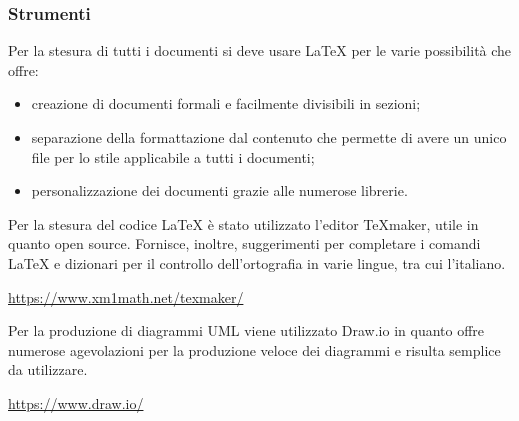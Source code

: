 \subsubsection{Strumenti}
\myparagraph{\LaTeX}
Per la stesura di tutti i documenti si deve usare \LaTeX{} per le varie possibilità che offre:
\begin{itemize}
\item creazione di documenti formali e facilmente divisibili in sezioni;
\item separazione della formattazione dal contenuto che permette di avere un unico file per lo stile applicabile a tutti i documenti;
\item personalizzazione dei documenti grazie alle numerose librerie.
\end{itemize}

Per la stesura del codice \LaTeX{} è stato utilizzato l'editor \TeX maker, utile in quanto open source. Fornisce, inoltre, suggerimenti per completare i comandi \LaTeX{} e dizionari per il controllo dell'ortografia in varie lingue, tra cui l'italiano.
\begin{center}
\url{https://www.xm1math.net/texmaker/}
\end{center}

Per la produzione di diagrammi UML viene utilizzato Draw.io in quanto offre numerose agevolazioni per la produzione veloce dei diagrammi e risulta semplice da utilizzare.
\begin{center}
\url{https://www.draw.io/}
\end{center}